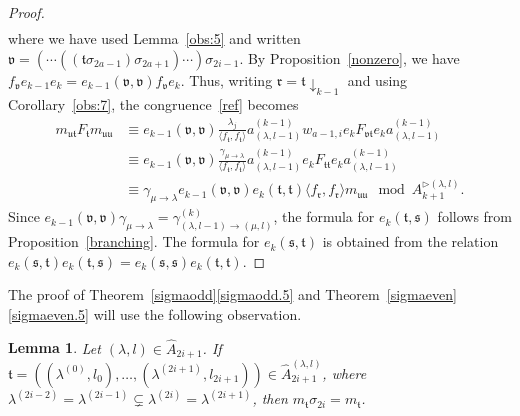 \documentclass[11pt,a4paper,reqno,svgnames]{amsart}
\theoremstyle{plain}
\newtheorem{lemma}[theorem]{Lemma}
\theoremstyle{definition}
\numberwithin{equation}{section}
\begin{document}
\begin{proof}
\begin{align}
\end{align}
where we have used Lemma~\ref{obs:5} and written $\mathfrak{v}= (\cdots ((\mathfrak{t}\sigma_{2a-1})\sigma_{2a+1})\cdots)\sigma_{2i-1}$. By Proposition~\ref{nonzero}, we have $f_\mathfrak{v}e_{k-1}e_k=e_{k-1}(\mathfrak{v,v})f_\mathfrak{v}e_k$. Thus, writing $\mathfrak{r}=\mathfrak{t}\downarrow_{k-1}$ and using Corollary~\ref{obs:7}, the congruence~\eqref{ref} becomes 
\begin{align*}
m_\mathfrak{ut}F_\mathfrak{t} m_\mathfrak{uu}&\equiv e_{k-1}(\mathfrak{v,v})\frac{\lambda_j}{\langle f_\mathfrak{t},f_\mathfrak{t}\rangle} a_{(\lambda,l-1)}^{(k-1)} w_{a-1,i}e_{k}F_\mathfrak{vt}e_ka_{(\lambda,l-1)}^{(k-1)}\\
&\equiv e_{k-1}(\mathfrak{v,v})\frac{\gamma_{\mu\to\lambda}}{\langle f_\mathfrak{t},f_\mathfrak{t}\rangle} a_{(\lambda,l-1)}^{(k-1)} e_{k}F_\mathfrak{tt}e_ka_{(\lambda,l-1)}^{(k-1)}\\
&\equiv\gamma_{\mu\to\lambda} e_{k-1}(\mathfrak{v,v})e_k(\mathfrak{t,t})\langle f_\mathfrak{r},f_\mathfrak{r}\rangle m_\mathfrak{uu}\mod A_{k+1}^{\rhd(\lambda,l)}. 
\end{align*}
Since $e_{k-1}(\mathfrak{v,v})\gamma_{\mu\to\lambda}=\gamma^{(k)}_{(\lambda,l-1)\to(\mu,l)}$, the formula for $e_k(\mathfrak{t,s})$ follows from Proposition~\ref{branching}. The formula for $e_k(\mathfrak{s,t})$ is obtained from the relation  $e_k(\mathfrak{s,t})e_k(\mathfrak{t,s})= e_k(\mathfrak{s,s})e_k(\mathfrak{t,t})$. 
\end{proof}
The proof of Theorem~\ref{sigmaodd}\eqref{sigmaodd.5} and Theorem~\ref{sigmaeven}\eqref{sigmaeven.5} will use the following observation.
\begin{lemma}\label{e-v-b}
Let $(\lambda,{l})\in\hat{A}_{2i+1}$. If  $\mathfrak{t}=((\lambda^{(0)},l_0),\ldots,(\lambda^{(2i+1)},l_{2i+1}))\in\hat{A}_{2i+1}^{(\lambda,{l})}$, where $\lambda^{(2i-2)}=\lambda^{(2i-1)}\subsetneq \lambda^{(2i)}=\lambda^{(2i+1)}$, then $m_\mathfrak{t}\sigma_{2i} =m_\mathfrak{t}$.
\end{lemma}
\end{document}
